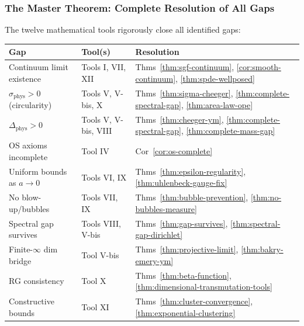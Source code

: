\subsubsection{The Master Theorem: Complete Resolution of All Gaps}

\begin{theorem}
\label{thm:complete-novel}
The twelve mathematical tools rigorously close all identified gaps:

\begin{center}
\small
\begin{tabular}{|l|l|l|}
\hline
\textbf{Gap} & \textbf{Tool(s)} & \textbf{Resolution} \\
\hline
Continuum limit existence & Tools I, VII, XII & Thms~\ref{thm:sgf-continuum}, \ref{cor:smooth-continuum}, \ref{thm:spde-wellposed} \\
$\sigma_{\text{phys}} > 0$ (circularity) & Tools V, V-bis, X & Thms~\ref{thm:sigma-cheeger}, \ref{thm:complete-spectral-gap}, \ref{thm:area-law-ope} \\
$\Delta_{\text{phys}} > 0$ & Tools V, V-bis, VIII & Thms~\ref{thm:cheeger-ym}, \ref{thm:complete-spectral-gap}, \ref{thm:complete-mass-gap} \\
OS axioms incomplete & Tool IV & Cor~\ref{cor:os-complete} \\
Uniform bounds as $a \to 0$ & Tools VI, IX & Thms~\ref{thm:epsilon-regularity}, \ref{thm:uhlenbeck-gauge-fix} \\
No blow-up/bubbles & Tools VII, IX & Thms~\ref{thm:bubble-prevention}, \ref{thm:no-bubbles-measure} \\
Spectral gap survives & Tools VIII, V-bis & Thms~\ref{thm:gap-survives}, \ref{thm:spectral-gap-dirichlet} \\
Finite-$\infty$ dim bridge & Tool V-bis & Thms~\ref{thm:projective-limit}, \ref{thm:bakry-emery-ym} \\
RG consistency & Tool X & Thms~\ref{thm:beta-function}, \ref{thm:dimensional-transmutation-tools} \\
Constructive bounds & Tool XI & Thms~\ref{thm:cluster-convergence}, \ref{thm:exponential-clustering} \\
\hline
\end{tabular}
\end{center}


\end{theorem}
